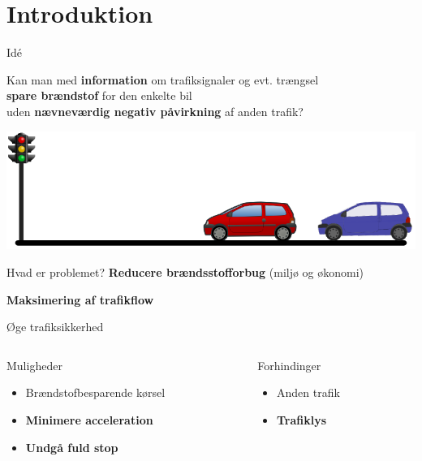 \section{Introduktion}

\begin{frame}{Idé}%
\begin{center}
Kan man med \textbf{information} om trafiksignaler og evt. trængsel\\\textbf{spare brændstof} for den enkelte bil\\uden \textbf{nævneværdig negativ påvirkning} af anden trafik?
\end{center}
\includegraphics[width=1\textwidth]{../images/idea.png}
\end{frame}

\begin{frame}{Hvad er problemet?}
\textbf{Reducere brændsstofforbug} (miljø og økonomi)

\textbf{Maksimering af trafikflow}

Øge trafiksikkerhed

\vspace{5mm}
\begin{columns}%
\begin{column}{0.5\textwidth}
Muligheder
\begin{itemize}
\item Brændstofbesparende kørsel
\item \textbf{Minimere acceleration}
\item \textbf{Undgå fuld stop}
\end{itemize}

\end{column}
\begin{column}{0.4\textwidth}
Forhindinger
\begin{itemize}
\item Anden trafik
\item \textbf{Trafiklys}
\end{itemize}
\end{column}
\end{columns}
\end{frame}

